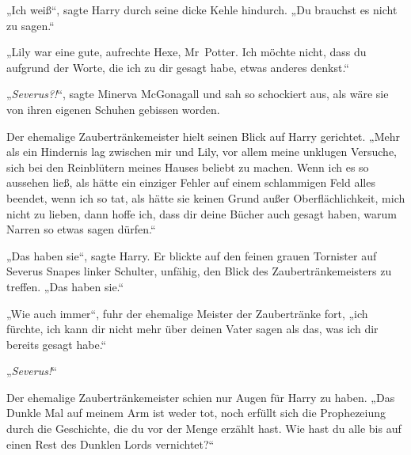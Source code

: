 „Ich weiß“, sagte Harry durch seine dicke Kehle hindurch.
„Du brauchst es nicht zu sagen.“

„Lily war eine gute, aufrechte Hexe, Mr~Potter. Ich möchte nicht, dass du aufgrund der Worte, die ich zu dir gesagt habe, etwas anderes denkst.“

„\emph{Severus?!}“, sagte Minerva McGonagall und sah so schockiert aus, als wäre sie von ihren eigenen Schuhen gebissen worden.

Der ehemalige Zaubertränkemeister hielt seinen Blick auf Harry gerichtet.
„Mehr als ein Hindernis lag zwischen mir und Lily, vor allem meine unklugen Versuche, sich bei den Reinblütern meines Hauses beliebt zu machen. Wenn ich es so aussehen ließ, als hätte ein einziger Fehler auf einem schlammigen Feld alles beendet, wenn ich so tat, als hätte sie keinen Grund außer Oberflächlichkeit, mich nicht zu lieben, dann hoffe ich, dass dir deine Bücher auch gesagt haben, warum Narren so etwas sagen dürfen.“

„Das haben sie“, sagte Harry.
Er blickte auf den feinen grauen Tornister auf Severus Snapes linker Schulter, unfähig, den Blick des Zaubertränkemeisters zu treffen.
„Das haben sie.“

„Wie auch immer“, fuhr der ehemalige Meister der Zaubertränke fort, „ich fürchte, ich kann dir nicht mehr über deinen Vater sagen als das, was ich dir bereits gesagt habe.“

„\emph{Severus!}“

Der ehemalige Zaubertränkemeister schien nur Augen für Harry zu haben.
„Das Dunkle Mal auf meinem Arm ist weder tot, noch erfüllt sich die Prophezeiung durch die Geschichte, die du vor der Menge erzählt hast. Wie hast du alle bis auf einen Rest des Dunklen Lords vernichtet?“

